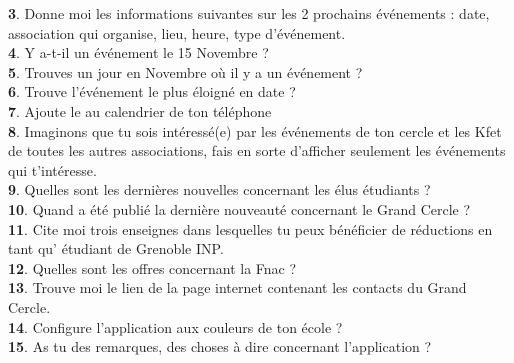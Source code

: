 \documentclass[a4paper, 11px]{article}
\begin{document}
\textbf{3}. Donne moi les informations suivantes sur les 2 prochains événements : date, association qui organise, lieu, heure, type d’événement.
  \\

\textbf{4}. Y a-t-il un événement le 15 Novembre ?
  \\

\textbf{5}. Trouves un jour en Novembre où il y a un événement ?	
  \\

\textbf{6}. Trouve l’événement le plus éloigné en date ?	
  \\

\textbf{7}. Ajoute le au calendrier de ton téléphone	
\\

\textbf{8}. Imaginons que tu sois intéressé(e) par les événements de ton cercle et les Kfet de toutes les autres associations, fais en sorte d’afficher seulement les événements qui t’intéresse.
\\

\textbf{9}. Quelles sont les dernières nouvelles concernant les élus étudiants ?	
  \\

\textbf{10}.  Quand a été publié la dernière nouveauté concernant le Grand Cercle ?	
\\

\textbf{11}.  Cite moi trois enseignes dans lesquelles tu peux bénéficier de réductions en tant qu' étudiant de Grenoble INP.
  \\

\textbf{12}. Quelles sont les offres concernant la Fnac ?	
\\

\textbf{13}.  Trouve moi le lien de la page internet contenant les contacts du Grand Cercle.	
  \\

\textbf{14}.  Configure l’application aux couleurs de ton école ?	
\\

\textbf{15}. As tu des remarques, des choses à dire concernant l’application ?	
  
\end{document}
